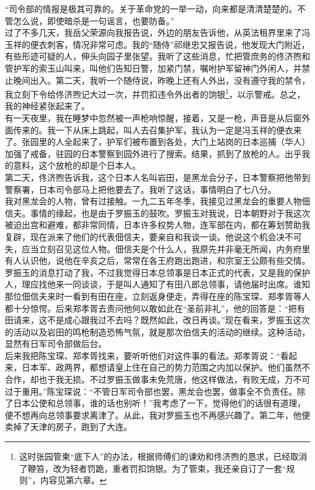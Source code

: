 “司令部的情报是极其可靠的。关于革命党的一举一动，向来都是清清楚楚的。不管怎么说，即使暗杀是一句谣言，也要防备。”\\

过了不多几天，我岳父荣源向我报告说，外边的朋友告诉他，从英法租界里来了冯玉祥的便衣刺客，情况非常可虑。我的“随侍”祁继忠又报告说，他发现大门附近，有些形迹可疑的人，伸头向园子里张望。我听了这些消息，忙把管庶务的佟济煦和管护军的索玉山叫来，叫他们告知日警，加紧门禁，嘱咐护军留神门外闲人，并禁止晚间出入。第二天，我听一个随侍说，昨晚上还有人外出，没有遵守我的禁令，我立刻下令给佟济煦记大过一次，并罚扣违令外出者的饷银\footnote{这时张园管柬“底下人”的办法，根据师傅们的谏劝和佟济煦的恳求，已经取消了鞭笞，改为轻者罚跪，重者罚扣饷银。为了管束，我还亲自订了一套“规则”，内容见第六章。}，以示警戒。总之，我的神经紧张起来了。\\

有一天夜里，我在睡梦中忽然被一声枪响惊醒，接着，又是一枪，声音是从后窗外面传来的。我一下从床上跳起，叫人去召集护军，我认为一定是冯玉祥的便衣来了。张园里的人全起来了，护军们被布置到各处，大门上站岗的日本巡捕（华人）加强了戒备，驻园的日本警察到园外进行了搜索。结果，抓到了放枪的人。出乎我的意料，这个放枪的却是个日本人。\\

第二天，佟济煦告诉我，这个日本人名叫岩田，是黑龙会分子，日本警察把他带到警察署，日本司令部马上把他要去了。我听了这话，事情明白了七八分。\\

我对黑龙会的人物，曾有过接触。一九二五年冬季，我接见过黑龙会的重要人物佃信夫。事情的缘起，也是由于罗振玉的鼓吹。罗振玉对我说，日本朝野对于我这次被迫出宫和避难，都非常同情，日本许多权势人物，连军部在内，都在筹划赞助我复辟，现在派来了他们的代表佃信夫，要亲自和我谈一谈。他说这个机会决不可失，应当立刻召见这位人物。佃信夫是个什么人，我原先并非毫无所闻，内务府里有人认识他，说他在辛亥之后，常常在各王府跑出跑进，和宗室王公颇有些交情。罗振玉的消息打动了我，不过我觉得日本总领事是日本正式的代表，又是我的保护人，理应找他来一同谈谈，于是叫人通知了有田八郎总领事，请他届时出席。谁知那位佃信夫来时一看到有田在座，立刻返身便走，弄得在座的陈宝琛、郑孝胥等人都十分惊愕。后来郑孝胥去责问他何以敢如此在“圣前非礼”，他的回答是：“把有田请来，这不是成心跟我过不去吗？既然如此，改日再谈。”现在看来，罗振玉这次的活动以及岩田的鸣枪制造恐怖气氛，就是那次伯信夫的活动的继续。这种活动，显然有日军司令部做后台。\\

后来我把陈宝琛、郑孝胥找来，要听听他们对这件事的看法。郑孝胥说：“看起来，日本军、政两界，都想请皇上住在自己的势力范围之内加以保护。他们虽然不合作，却也于我无损。不过罗振玉做事未免荒唐，他这样做法，有败无成，万不可过于重用。”陈宝琛说：“不管日军司令部也罢，黑龙会也罢，做事全不负责任。除了日本公使和总领事，谁的话也别听！”我考虑了一下，觉得他们的话很有道理，便不想再向总领事要求离津了。从此，我对罗振玉也不再感兴趣了。第二年，他便卖掉了天津的房子，跑到了大连。\\

